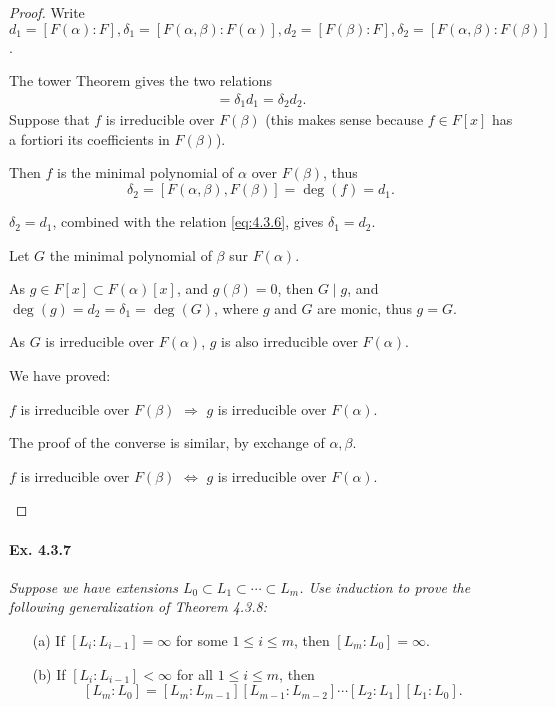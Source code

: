 \documentclass[11pt,a4paper]{article}
\begin{document}
\begin{proof}
Write $d_1 =[F(\alpha) : F], \delta_1= [F(\alpha,\beta):F(\alpha)], d_2 = [F(\beta):F],\delta_2 = [F(\alpha,\beta):F(\beta)]$.

The tower Theorem  gives the two relations
\begin{align}
[F(\alpha,\beta) :F] = \delta_1 d_1 = \delta_2 d_2. \label{eq:4.3.6}
\end{align}
Suppose that $f$ is irreducible over $F(\beta)$ (this makes sense because $f \in F[x]$ has a fortiori its coefficients in $F(\beta)$).

Then $f$ is the minimal polynomial of  $\alpha$ over $F(\beta)$, thus $$ \delta_2  = [F(\alpha,\beta),F(\beta)] = \deg(f) =d_1.$$

$\delta_2 = d_1$, combined with the relation \eqref{eq:4.3.6}, gives $\delta_1= d_2$.

Let $G$ the minimal polynomial of  $\beta$ sur $F(\alpha)$.

As $g \in F[x] \subset F(\alpha)[x]$, and $g(\beta)=0$, then $G \mid g$, and $\deg(g) = d_2 = \delta_1 = \deg(G)$, where $g$ and  $G$ are monic, thus $g=G$.

As $G$ is irreducible over $F(\alpha)$, $g$ is also irreducible over $F(\alpha)$.

We have proved:
\begin{center}
$f$ is irreducible over $F(\beta)$ $\Rightarrow$ $g$ is irreducible over $F(\alpha)$.
\end{center}
The proof of the converse is similar, by exchange of $\alpha,\beta$.

\begin{center}
$f$ is irreducible over $F(\beta)$ $\iff$ $g$ is irreducible over $F(\alpha)$.
\end{center}
\end{proof}

\paragraph{Ex. 4.3.7}

{\it Suppose we have extensions $L_0 \subset L_1 \subset \cdots \subset L_m$. Use induction to prove the following generalization of Theorem 4.3.8:
\begin{enumerate}
\item[(a)] If $[L_i:L_{i-1}] = \infty$ for some $1\leq i \leq m$, then $[L_m:L_0] = \infty$.
\item[(b)] If $[L_i:L_{i-1}] < \infty$ for all $1\leq i \leq m$, then
$$[L_m:L_0] = [L_m:L_{m-1}][L_{m-1}:L_{m-2}]\cdots[L_2:L_1][L_1:L_0].$$
\end{enumerate}
}
\end{document}
